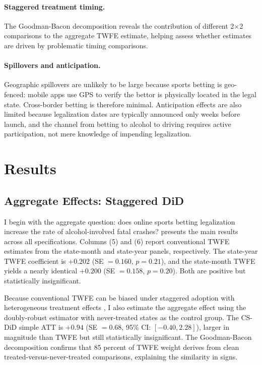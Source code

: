 \documentclass[12pt]{article}
\begin{document}
\paragraph{Staggered treatment timing.} The Goodman-Bacon decomposition \citep{goodmanbacon2021difference} reveals the contribution of different 2$\times$2 comparisons to the aggregate TWFE estimate, helping assess whether estimates are driven by problematic timing comparisons.

\paragraph{Spillovers and anticipation.} Geographic spillovers are unlikely to be large because sports betting is geo-fenced: mobile apps use GPS to verify the bettor is physically located in the legal state. Cross-border betting is therefore minimal. Anticipation effects are also limited because legalization dates are typically announced only weeks before launch, and the channel from betting to alcohol to driving requires active participation, not mere knowledge of impending legalization.


\section{Results}
\label{sec:results}

\subsection{Aggregate Effects: Staggered DiD}

I begin with the aggregate question: does online sports betting legalization increase the rate of alcohol-involved fatal crashes?  presents the main results across all specifications. Columns (5) and (6) report conventional TWFE estimates from the state-month and state-year panels, respectively. The state-year TWFE coefficient is $+0.202$ (SE $= 0.160$, $p = 0.21$), and the state-month TWFE yields a nearly identical $+0.200$ (SE $= 0.158$, $p = 0.20$). Both are positive but statistically insignificant.

Because conventional TWFE can be biased under staggered adoption with heterogeneous treatment effects \citep{goodmanbacon2021difference, sunabraham2021estimating}, I also estimate the aggregate effect using the doubly-robust \citet{callaway2021difference} estimator with never-treated states as the control group. The CS-DiD simple ATT is $+0.94$ (SE $= 0.68$, 95\% CI: $[-0.40, 2.28]$), larger in magnitude than TWFE but still statistically insignificant. The Goodman-Bacon decomposition confirms that 85 percent of TWFE weight derives from clean treated-versus-never-treated comparisons, explaining the similarity in signs.
\end{document}
